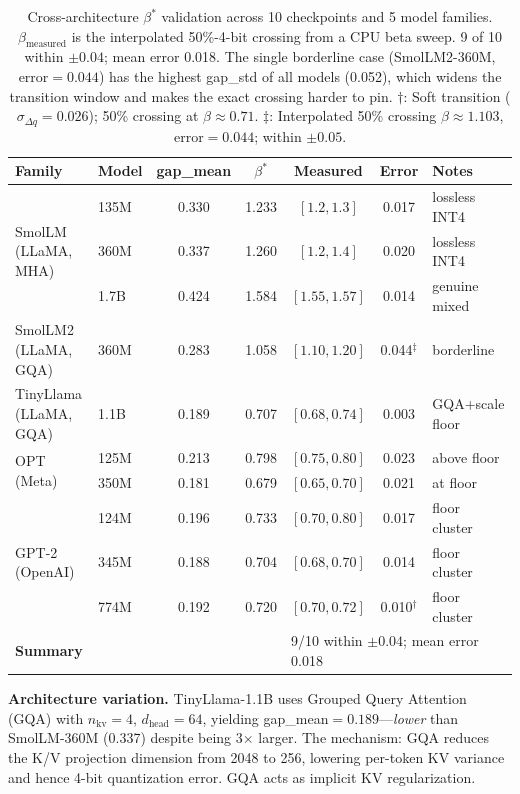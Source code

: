 \documentclass{article}
\begin{document}
\begin{table}[h]
\centering
\caption{Cross-architecture $\beta^*$ validation across 10 checkpoints and 5 model families.
$\beta_\text{measured}$ is the interpolated 50\%-4-bit crossing from a CPU beta sweep.
9 of 10 within $\pm 0.04$; mean error 0.018. The single borderline case
(SmolLM2-360M, error$=0.044$) has the highest gap\_std of all models (0.052),
which widens the transition window and makes the exact crossing harder to pin.
$\dagger$: Soft transition ($\sigma_{\Delta q}=0.026$); 50\% crossing at $\beta\approx0.71$.
$\ddagger$: Interpolated 50\% crossing $\beta\approx1.103$, error$=0.044$; within $\pm0.05$.}
\begin{tabular}{llccccl}
\toprule
Family & Model & gap\_mean & $\beta^*$ & Measured & Error & Notes \\
\midrule
\multirow{3}{*}{SmolLM (LLaMA, MHA)}
  & 135M & 0.330 & 1.233 & $[1.2, 1.3]$ & 0.017 & lossless INT4 \\
  & 360M & 0.337 & 1.260 & $[1.2, 1.4]$ & 0.020 & lossless INT4 \\
  & 1.7B & 0.424 & 1.584 & $[1.55, 1.57]$ & 0.014 & genuine mixed \\
\midrule
SmolLM2 (LLaMA, GQA)  & 360M & 0.283 & 1.058 & $[1.10, 1.20]$ & 0.044$^\ddagger$ & borderline \\
\midrule
TinyLlama (LLaMA, GQA) & 1.1B & 0.189 & 0.707 & $[0.68, 0.74]$ & 0.003 & GQA+scale floor \\
\midrule
\multirow{2}{*}{OPT (Meta)}
  & 125M & 0.213 & 0.798 & $[0.75, 0.80]$ & 0.023 & above floor \\
  & 350M & 0.181 & 0.679 & $[0.65, 0.70]$ & 0.021 & at floor \\
\midrule
\multirow{3}{*}{GPT-2 (OpenAI)}
  & 124M & 0.196 & 0.733 & $[0.70, 0.80]$ & 0.017 & floor cluster \\
  & 345M & 0.188 & 0.704 & $[0.68, 0.70]$ & 0.014 & floor cluster \\
  & 774M & 0.192 & 0.720 & $[0.70, 0.72]$ & 0.010$^\dagger$ & floor cluster \\
\midrule
\multicolumn{4}{l}{\textbf{Summary}} & \multicolumn{3}{l}{9/10 within $\pm0.04$; mean error 0.018} \\
\bottomrule
\end{tabular}
\label{tab:betastar}
\end{table}

\textbf{Architecture variation.} TinyLlama-1.1B uses Grouped Query Attention (GQA) with
$n_\text{kv}{=}4$, $d_\text{head}{=}64$, yielding gap\_mean$=0.189$---\emph{lower} than
SmolLM-360M (0.337) despite being 3$\times$ larger. The mechanism: GQA reduces the K/V
projection dimension from 2048 to 256, lowering per-token KV variance and hence 4-bit
quantization error. GQA acts as implicit KV regularization.
\end{document}

